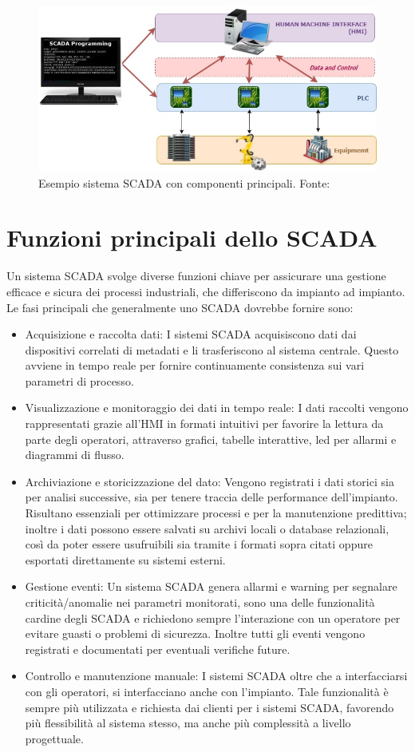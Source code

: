 \begin{figure}
    \centering
    \includegraphics[width=0.7\linewidth]{Immagini/SCADA_system.jpg}
    \caption{Esempio sistema SCADA con componenti principali. Fonte: \cite{exonsys_scada}}
    \label{fig:SCADA_system.jpg}
\end{figure}

\section{Funzioni principali dello SCADA}
Un sistema SCADA svolge diverse funzioni chiave per assicurare una gestione efficace e sicura dei processi industriali, che differiscono da impianto ad impianto. Le fasi principali che generalmente uno SCADA dovrebbe fornire sono:
\begin{itemize}
    \item Acquisizione e raccolta dati: I sistemi SCADA acquisiscono dati dai dispositivi correlati di metadati e li trasferiscono al sistema centrale. Questo avviene in tempo reale per fornire continuamente consistenza sui vari parametri di processo.
    \item Visualizzazione e monitoraggio dei dati in tempo reale: I dati raccolti vengono rappresentati grazie all'HMI in formati intuitivi per favorire la lettura da parte degli operatori, attraverso grafici, tabelle interattive, led per allarmi e diagrammi di flusso.
    \item Archiviazione e storicizzazione del dato: Vengono registrati i dati storici sia per analisi successive, sia per tenere traccia delle performance dell'impianto. Risultano essenziali per ottimizzare processi e per la manutenzione predittiva; inoltre i dati possono essere salvati su archivi locali o database relazionali, così da poter essere usufruibili sia tramite i formati sopra citati oppure esportati direttamente su sistemi esterni.
    \item Gestione eventi: Un sistema SCADA genera allarmi e warning per segnalare criticità/anomalie nei parametri monitorati, sono una delle funzionalità cardine degli SCADA e richiedono sempre l'interazione con un operatore per evitare guasti o problemi di sicurezza. Inoltre tutti gli eventi vengono registrati e documentati per eventuali verifiche future.
    \item Controllo e manutenzione manuale: I sistemi SCADA oltre che a interfacciarsi con gli operatori, si interfacciano anche con l'impianto. Tale funzionalità è sempre più utilizzata e richiesta dai clienti per i sistemi SCADA, favorendo più flessibilità al sistema stesso, ma anche più complessità a livello progettuale.
\end{itemize}
